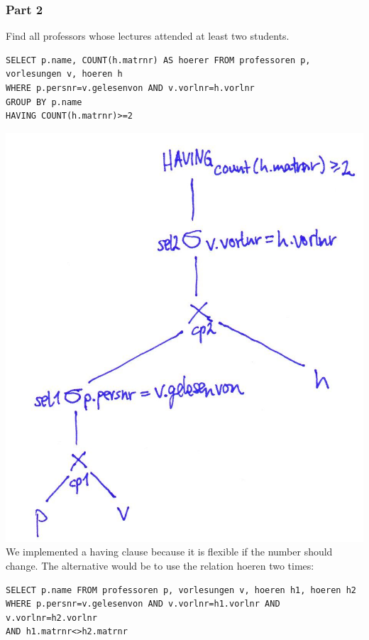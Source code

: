 \documentclass[11pt,a4paper]{scrartcl}
\begin{document}
\subsubsection*{Part 2}
Find all professors whose lectures attended at least two students.
\begin{verbatim}
SELECT p.name, COUNT(h.matrnr) AS hoerer FROM professoren p, vorlesungen v, hoeren h
WHERE p.persnr=v.gelesenvon AND v.vorlnr=h.vorlnr
GROUP BY p.name
HAVING COUNT(h.matrnr)>=2
\end{verbatim}
\includegraphics[scale=1]{part2a.jpg}\\
We implemented a having clause because it is flexible if the number should change.
The alternative would be to use the relation hoeren two times:
\begin{verbatim}
SELECT p.name FROM professoren p, vorlesungen v, hoeren h1, hoeren h2
WHERE p.persnr=v.gelesenvon AND v.vorlnr=h1.vorlnr AND v.vorlnr=h2.vorlnr
AND h1.matrnr<>h2.matrnr
\end{verbatim}
\end{document}
